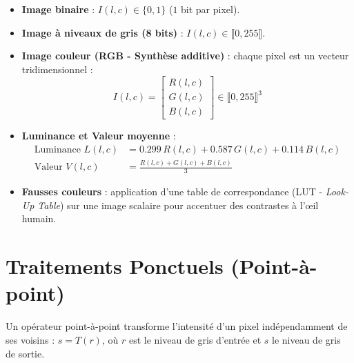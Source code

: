 \begin{itemize}
    \item \textbf{Image binaire} : $I(l,c) \in \{0, 1\}$ ($1$ bit par pixel).
    \item \textbf{Image à niveaux de gris (8 bits)} : $I(l,c) \in \llbracket 0, 255 \rrbracket$.
    \item \textbf{Image couleur (RGB - Synthèse additive)} : chaque pixel est un vecteur tridimensionnel :
        $$ I(l,c) = \begin{bmatrix} R(l,c) \\ G(l,c) \\ B(l,c) \end{bmatrix} \in \llbracket 0, 255 \rrbracket^3 $$
    \item \textbf{Luminance et Valeur moyenne} :
        \begin{align}
            \text{Luminance } L(l,c) &= 0.299 \, R(l,c) + 0.587 \, G(l,c) + 0.114 \, B(l,c) \\
            \text{Valeur } V(l,c) &= \frac{R(l,c) + G(l,c) + B(l,c)}{3}
        \end{align}
    \item \textbf{Fausses couleurs} : application d'une table de correspondance (LUT - \emph{Look-Up Table}) sur une image scalaire pour accentuer des contrastes à l'œil humain.
\end{itemize}


\section{Traitements Ponctuels (Point-à-point)}

Un opérateur point-à-point transforme l'intensité d'un pixel indépendamment de ses voisins : $s = T(r)$, où $r$ est le niveau de gris d'entrée et $s$ le niveau de gris de sortie.

